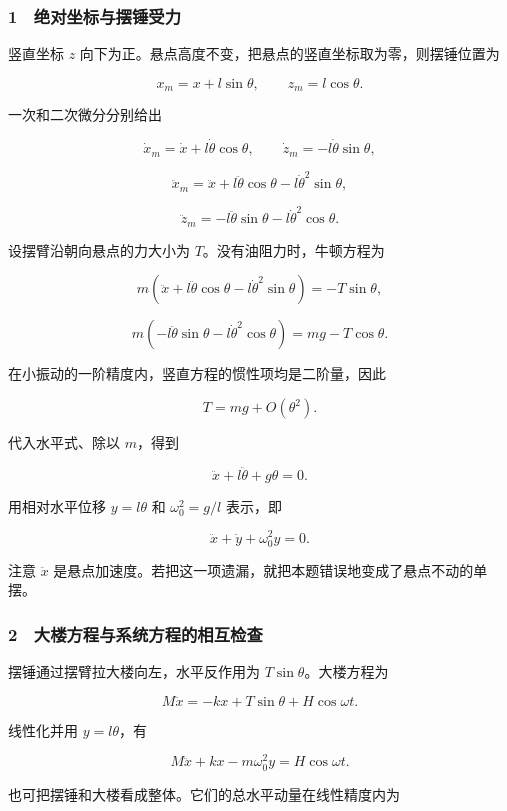 \documentclass[12pt,a4paper,fontset=fandol]{ctexart}
\begin{document}
\subsubsection{1　绝对坐标与摆锤受力}\label{ux7eddux5bf9ux5750ux6807ux4e0eux6446ux9524ux53d7ux529b}

竖直坐标 \(z\)
向下为正。悬点高度不变，把悬点的竖直坐标取为零，则摆锤位置为

\[x_m=x+l\sin\theta,\qquad z_m=l\cos\theta.\]

一次和二次微分分别给出

\[\dot x_m=\dot x+l\dot\theta\cos\theta,
\qquad \dot z_m=-l\dot\theta\sin\theta,\]

\[\ddot x_m=\ddot x+l\ddot\theta\cos\theta-l\dot\theta^2\sin\theta,\]

\[\ddot z_m=-l\ddot\theta\sin\theta-l\dot\theta^2\cos\theta.\]

设摆臂沿朝向悬点的力大小为 \(T\)。没有油阻力时，牛顿方程为

\[m(\ddot x+l\ddot\theta\cos\theta-l\dot\theta^2\sin\theta)
=-T\sin\theta,\]

\[m(-l\ddot\theta\sin\theta-l\dot\theta^2\cos\theta)
=mg-T\cos\theta.\]

在小振动的一阶精度内，竖直方程的惯性项均是二阶量，因此

\[T=mg+O(\theta^2).\]

代入水平式、除以 \(m\)，得到

\[\boxed{\ddot x+l\ddot\theta+g\theta=0.}\]

用相对水平位移 \(y=l\theta\) 和 \(\omega_0^2=g/l\) 表示，即

\[\boxed{\ddot x+\ddot y+\omega_0^2y=0.}\]

注意 \(\ddot x\)
是悬点加速度。若把这一项遗漏，就把本题错误地变成了悬点不动的单摆。

\subsubsection{2　大楼方程与系统方程的相互检查}\label{ux5927ux697cux65b9ux7a0bux4e0eux7cfbux7edfux65b9ux7a0bux7684ux76f8ux4e92ux68c0ux67e5}

摆锤通过摆臂拉大楼向左，水平反作用为 \(T\sin\theta\)。大楼方程为

\[M\ddot x=-kx+T\sin\theta+H\cos\omega t.\]

线性化并用 \(y=l\theta\)，有

\[\boxed{M\ddot x+kx-m\omega_0^2y=H\cos\omega t.}\]

也可把摆锤和大楼看成整体。它们的总水平动量在线性精度内为
\end{document}
